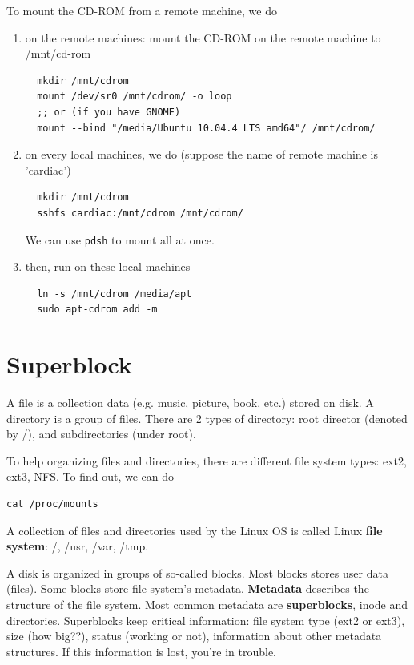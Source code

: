 To mount the CD-ROM from a remote machine, we do
\begin{enumerate}
  \item on the remote machines: mount the CD-ROM on the remote machine to
  /mnt/cd-rom
  \begin{verbatim}
  mkdir /mnt/cdrom
  mount /dev/sr0 /mnt/cdrom/ -o loop
  ;; or (if you have GNOME)
  mount --bind "/media/Ubuntu 10.04.4 LTS amd64"/ /mnt/cdrom/
  \end{verbatim}
  
  \item on every local machines, we do (suppose the name of remote machine is
  'cardiac')
  \begin{verbatim}
  mkdir /mnt/cdrom
  sshfs cardiac:/mnt/cdrom /mnt/cdrom/
  \end{verbatim}
  We can use \verb!pdsh! to mount all at once.
  
  \item then, run on these local machines
  \begin{verbatim}
  ln -s /mnt/cdrom /media/apt
  sudo apt-cdrom add -m
  \end{verbatim} 
\end{enumerate}

\section{Superblock}

A file is a collection data (e.g. music, picture, book, etc.) stored on disk. A
directory is a group of files. There are 2 types of directory: root director
(denoted by /), and subdirectories (under root).

To help organizing files and directories, there are different file system types:
ext2, ext3, NFS. To find out, we can do
\begin{verbatim}
cat /proc/mounts
\end{verbatim}
A collection of files and directories used by the Linux OS is called Linux
{\bf file system}: /, /usr, /var, /tmp. 

A disk is organized in groups of so-called blocks. Most blocks stores user data
(files). Some blocks store file system's metadata. {\bf Metadata} describes the
structure of the file system. Most common metadata are {\bf superblocks}, inode
and directories. Superblocks keep critical information: file system type (ext2
or ext3), size (how big??), status (working or not), information about other
metadata structures. If this information is lost, you're in trouble.

